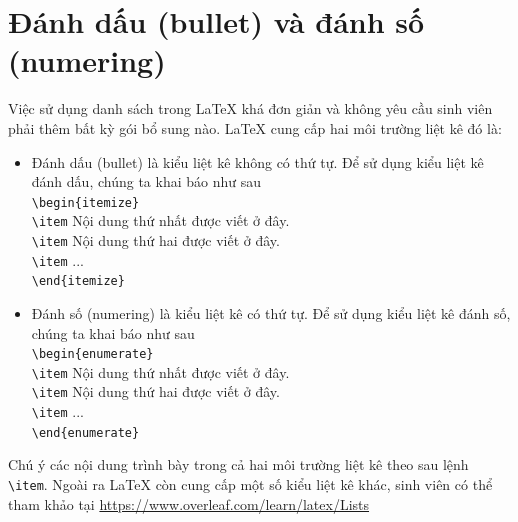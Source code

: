 \documentclass[../DoAn.tex]{subfiles}
\begin{document}
\section{Đánh dấu (bullet) và đánh số (numering)}
Việc sử dụng danh sách trong LaTeX khá đơn giản và không yêu cầu sinh viên phải thêm bất kỳ gói bổ sung nào. LaTeX cung cấp hai môi trường liệt kê đó là:
\begin{itemize}
\item Đánh dấu (bullet) là kiểu liệt kê không có thứ tự. Để sử dụng kiểu liệt kê đánh dấu, chúng ta khai báo như sau\\ 
\verb$\begin{itemize}$\\
 \verb$\item$ Nội dung thứ nhất được viết ở đây.\\
\verb$\item$ Nội dung thứ hai được viết ở đây.\\
 \verb$\item$ ...\\
\verb$\end{itemize}$
\item Đánh số (numering) là kiểu liệt kê có thứ tự. Để sử dụng kiểu liệt kê đánh số, chúng ta khai báo như sau\\
\verb$\begin{enumerate}$\\
 \verb$\item$ Nội dung thứ nhất được viết ở đây.\\
\verb$\item$ Nội dung thứ hai được viết ở đây.\\
 \verb$\item$ ...\\
\verb$\end{enumerate}$
\end{itemize}
Chú ý các nội dung trình bày trong cả hai môi trường liệt kê theo sau lệnh \verb$\item$. Ngoài ra LaTeX còn cung cấp một số kiểu liệt kê khác, sinh viên có thể tham khảo tại \url{https://www.overleaf.com/learn/latex/Lists}
\end{document}
